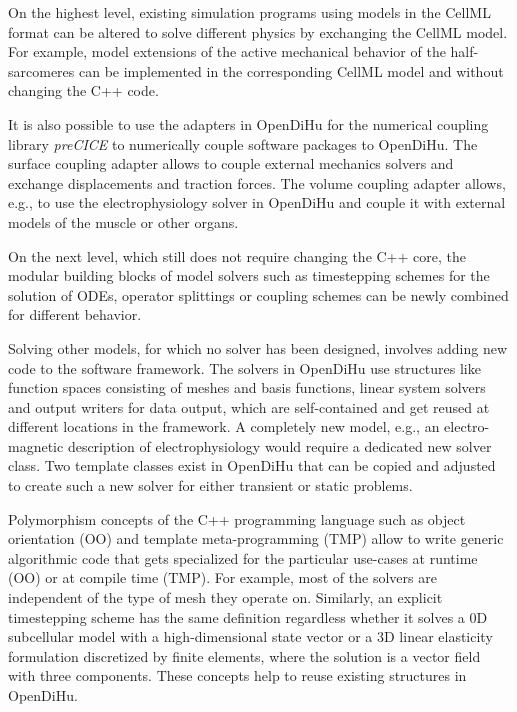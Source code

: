 On the highest level, existing simulation programs using models in the CellML format can be altered to solve different physics by exchanging the CellML model. For example, model extensions of the active mechanical behavior of the half-sarcomeres can be implemented in the corresponding CellML model and without changing the C++ code.

It is also possible to use the adapters in OpenDiHu for the numerical coupling library \emph{preCICE} \cite{precice} to numerically couple  software packages to OpenDiHu. The surface coupling adapter allows to couple external mechanics solvers and exchange displacements and traction forces. The volume coupling adapter allows, e.g., to use the electrophysiology solver in OpenDiHu and couple it with external models of the muscle or other organs.

On the next level, which still does not require changing the C++ core, the modular building blocks of model solvers such as timestepping schemes for the solution of ODEs, operator splittings or coupling schemes can be newly combined for different behavior.

Solving other models, for which no solver has been designed, involves adding new code to the software framework.
The solvers in OpenDiHu use structures like function spaces consisting of meshes and basis functions, linear system solvers and output writers for data output, which are self-contained and get reused at different locations in the framework. A completely new model, e.g., an electro-magnetic description of electrophysiology would require a dedicated new solver class. 
Two template classes exist in OpenDiHu that can be copied and adjusted to create such a new solver for either transient or static problems.

Polymorphism concepts of the C++ programming language such as object orientation (OO) and template meta-programming (TMP) allow to write generic algorithmic code that gets specialized for the particular use-cases at runtime (OO) or at compile time (TMP). For example, most of the solvers are independent of the type of mesh they operate on. Similarly, an explicit timestepping scheme has the same definition regardless whether it solves a 0D subcellular model with a high-dimensional state vector or a 3D linear elasticity formulation discretized by finite elements, where the solution is a vector field with three components.
These concepts help to reuse existing structures in OpenDiHu.


